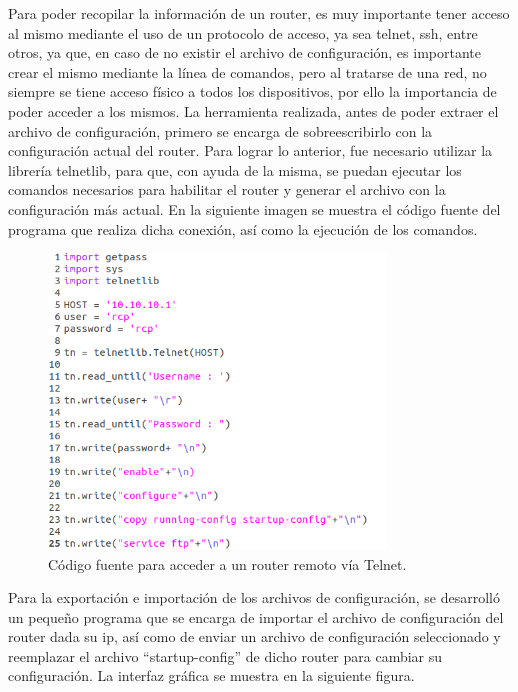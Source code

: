 Para poder recopilar la información de un router, es muy importante tener acceso al mismo mediante el uso de un protocolo de acceso, ya sea telnet, ssh, entre otros, ya que, en caso de no existir el archivo de configuración, es importante crear el mismo mediante la línea de comandos, pero al tratarse de una red, no siempre se tiene acceso físico a todos los dispositivos, por ello la importancia de poder acceder a los mismos.\newline
La herramienta realizada, antes de poder extraer el archivo de configuración, primero se encarga de sobreescribirlo con la configuración actual del router. Para lograr lo anterior, fue necesario utilizar la librería telnetlib, para que, con ayuda de la misma, se puedan ejecutar los comandos necesarios para habilitar el router y generar el archivo con la configuración más actual.\newline
En la siguiente imagen se muestra el código fuente del programa que realiza dicha conexión, así como la ejecución de los comandos.

\pagebreak
\begin{figure}[htbp!]
	\centering
		\includegraphics[width=0.8\textwidth]{desarrollo/tarea3/imagenes/imagen1.png}
	\caption{Código fuente para acceder a un router remoto vía Telnet.}
\end{figure}

Para la exportación e importación de los archivos de configuración, se desarrolló un pequeño programa que se encarga de importar el archivo de configuración del router dada su ip, así como de enviar un archivo de configuración seleccionado y reemplazar el archivo “startup-config” de dicho router para cambiar su configuración. La interfaz gráfica se muestra en la siguiente figura.

